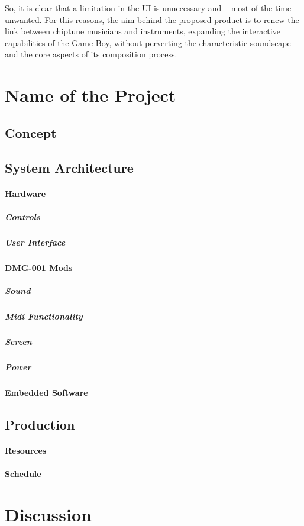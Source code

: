 \documentclass[]{article}
\begin{document}
            So, it is clear that a limitation in the UI is unnecessary and -- most of the time -- unwanted. For this reasons, the aim 
            behind the proposed product is to renew the link between chiptune musicians and instruments, expanding the interactive capabilities of the Game Boy, 
            without perverting the characteristic soundscape and the core aspects of its composition process.

\section{Name of the Project}  %
    \subsection{Concept}
    \subsection{System Architecture}
        \paragraph{Hardware}
            \subparagraph{Controls}
            \subparagraph{User Interface}
        \paragraph{DMG-001 Mods}
            \subparagraph{Sound}
            \subparagraph{Midi Functionality}
            \subparagraph{Screen}
            \subparagraph{Power}
        \paragraph{Embedded Software}
    \subsection{Production}
        \paragraph{Resources}
        \paragraph{Schedule}

\section{Discussion}
\end{document}
